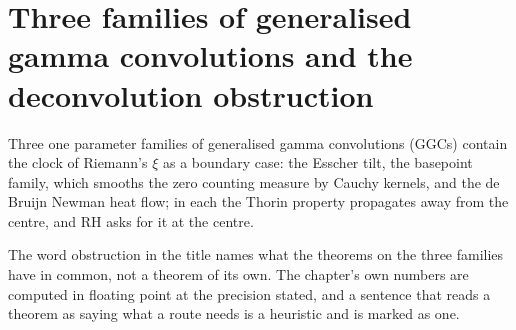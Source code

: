 \chapter{Three families of generalised gamma convolutions and the deconvolution obstruction}\label{chap:tf}

Three one parameter families of generalised gamma convolutions (GGCs) contain the clock of Riemann's $\xi$ as a boundary case: the Esscher tilt, the basepoint family, which smooths the zero counting measure by Cauchy kernels, and the de Bruijn Newman heat flow; in each the Thorin property propagates away from the centre, and RH asks for it at the centre.

The word obstruction in the title names what the theorems on the three families have in common, not a theorem of its own. The chapter's own numbers are computed in floating point at the precision stated, and a sentence that reads a theorem as saying what a route needs is a heuristic and is marked as one.
